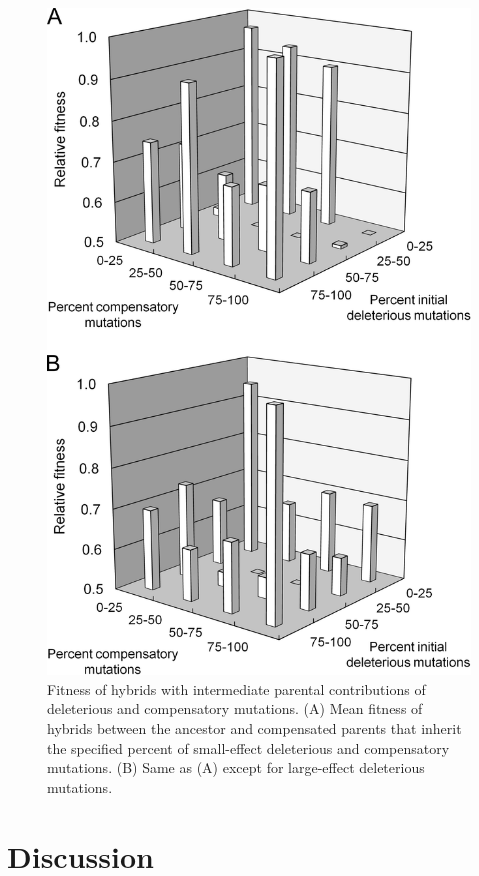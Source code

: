 \begin{doublespace}
\begin{figure}
\centering
\includegraphics[width=4.5in]{fig3.png}
\caption{Fitness of hybrids with intermediate parental contributions
  of deleterious and compensatory mutations.
  (A) Mean fitness of hybrids between the ancestor
  and compensated parents that inherit the specified percent of small-effect
  deleterious and compensatory mutations. (B) Same as (A) except for
  large-effect deleterious mutations.}
\label{fig3}
\end{figure}



\section{Discussion}


\end{doublespace}
